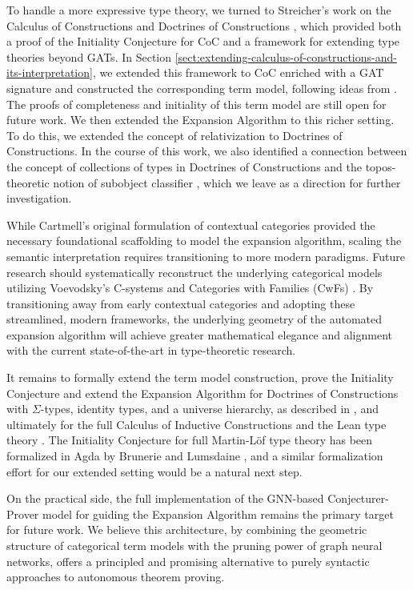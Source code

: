 To handle a more expressive type theory, we turned to Streicher's 
work on the Calculus of Constructions and Doctrines of Constructions \cite{streicher}, 
which provided both a proof of the Initiality Conjecture for CoC 
and a framework for extending type theories beyond GATs. 
In Section \ref{sect:extending-calculus-of-constructions-and-its-interpretation}, we extended this framework 
to CoC enriched with a GAT signature and constructed the corresponding 
term model, following ideas from \cite{bezem2021}. 
The proofs of completeness and initiality of this term model are still open for future work.
We then extended the Expansion Algorithm to this 
richer setting. To do this, we extended the concept of relativization to Doctrines of Constructions. 
In the course of this work, we also identified a 
connection between the concept of collections of types in Doctrines 
of Constructions and the topos-theoretic notion of subobject 
classifier \cite{maclane1992}, which we leave as a direction for further 
investigation.

While Cartmell's original formulation of contextual categories provided the necessary foundational scaffolding to model 
the expansion algorithm, scaling the semantic interpretation requires transitioning to more modern paradigms.
Future research should systematically reconstruct the underlying categorical models utilizing Voevodsky's 
C-systems \cite{voevodsky2016} and Categories with Families (CwFs) \cite{dybjer96}.
By transitioning away from early contextual categories and adopting these streamlined, modern frameworks, 
the underlying geometry of the automated expansion algorithm will achieve greater mathematical elegance and 
alignment with the current state-of-the-art in type-theoretic research.

It remains to formally extend the term model construction, 
prove the Initiality Conjecture and extend the Expansion Algorithm for Doctrines of 
Constructions with $\Sigma$-types, identity types, and a universe 
hierarchy, as described in \cite{streicher}, and ultimately for the full 
Calculus of Inductive Constructions \cite{coquand1990,paulin-mohring1993} and the Lean type 
theory \cite{demoura2015}. The Initiality Conjecture for full Martin-L\"of type theory 
has been formalized in Agda by Brunerie and Lumsdaine \cite{bruneire2020}, 
and a similar formalization effort for our extended setting 
would be a natural next step.

On the practical side, the full implementation of the GNN-based 
Conjecturer-Prover model for guiding the Expansion Algorithm 
remains the primary target for future work. We believe this 
architecture, by combining the geometric structure of categorical 
term models with the pruning power of graph neural networks, 
offers a principled and promising alternative to purely syntactic 
approaches to autonomous theorem proving.